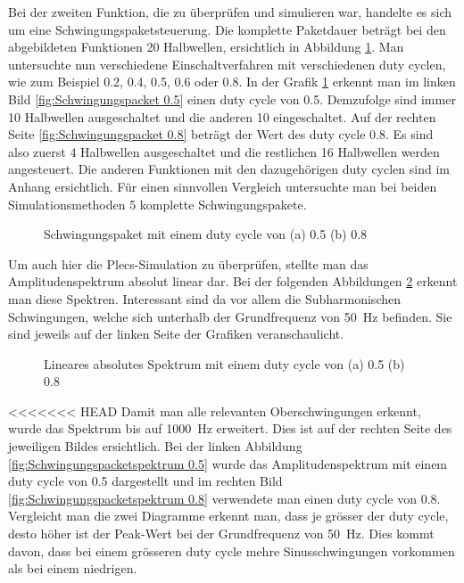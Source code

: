 Bei der zweiten Funktion, die zu überprüfen und simulieren war, handelte es sich um eine Schwingungspaketsteuerung. Die komplette Paketdauer beträgt bei den abgebildeten Funktionen 20 Halbwellen, ersichtlich in Abbildung \ref{fig:Schwingungspaket Matlab}. Man untersuchte nun verschiedene Einschaltverfahren mit verschiedenen duty cyclen, wie zum Beispiel 0.2, 0.4, 0.5, 0.6 oder 0.8. In der Grafik \ref{fig:Schwingungspaket Matlab} erkennt man im linken Bild \ref{fig:Schwingungspacket 0.5} einen duty cycle von 0.5. Demzufolge sind immer 10 Halbwellen ausgeschaltet und die anderen 10 eingeschaltet.
Auf der rechten Seite \ref{fig:Schwingungspacket 0.8} beträgt der Wert des duty cycle 0.8. Es sind also zuerst 4 Halbwellen ausgeschaltet und die restlichen 16 Halbwellen werden angesteuert. Die anderen Funktionen mit den dazugehörigen duty cyclen sind im Anhang ersichtlich. Für einen sinnvollen Vergleich untersuchte man bei beiden Simulationsmethoden 5 komplette Schwingungspakete. 

\begin{figure}[ht!]
	\centering
	\qquad
	\caption{Schwingungspaket mit einem duty cycle von (a) 0.5 (b) 0.8}
	\label{fig:Schwingungspaket Matlab}
\end{figure} 

Um auch hier die Plecs-Simulation zu überprüfen, stellte man das Amplitudenspektrum absolut linear dar. Bei der folgenden Abbildungen \ref{fig:Schwingungspaketspektrum Matlab} erkennt man diese Spektren. Interessant sind da vor allem die Subharmonischen Schwingungen, welche sich unterhalb der Grundfrequenz von \SI{50}{Hz} befinden. Sie sind jeweils auf der linken Seite der  Grafiken veranschaulicht.   

\begin{figure}[ht!]
	\centering
	\qquad
	\caption{Lineares absolutes Spektrum mit einem duty cycle von (a) 0.5 (b) 0.8}
	\label{fig:Schwingungspaketspektrum Matlab}
\end{figure}

<<<<<<< HEAD
Damit man alle relevanten Oberschwingungen erkennt, wurde das Spektrum bis auf \SI{1000}{Hz} erweitert. Dies ist auf der rechten Seite des jeweiligen Bildes ersichtlich. Bei der linken Abbildung \ref{fig:Schwingungspacketspektrum 0.5} wurde das Amplitudenspektrum mit einem duty cycle von 0.5 dargestellt und im rechten Bild \ref{fig:Schwingungspacketspektrum 0.8} verwendete man einen duty cycle von 0.8. Vergleicht man die zwei Diagramme erkennt man, dass je grösser der duty cycle, desto höher ist der Peak-Wert bei der Grundfrequenz von \SI{50}{Hz}. Dies kommt davon, dass bei einem grösseren duty cycle mehre Sinusschwingungen vorkommen als bei einem niedrigen.


